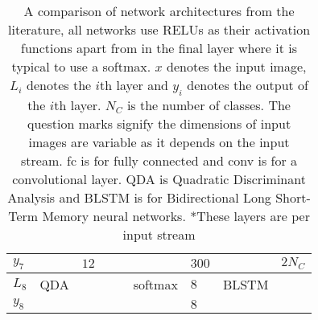 \begin{landscape}
\begin{table}[h!]
{\begin{tabular}{|lllllllll|}
\multicolumn{1}{|l|}{$y_7$}   &          & \multicolumn{1}{l|}{$12$}                          &          & \multicolumn{1}{l|}{}                                &               & \multicolumn{1}{l|}{$300$}                       &           & $2N_{C}$                       \\ \hline
\multicolumn{1}{|l|}{$L_8$}   & QDA      & \multicolumn{1}{l|}{}                              &          & \multicolumn{1}{l|}{}                                & softmax       & \multicolumn{1}{l|}{$8$}                         & BLSTM     &                                \\
\multicolumn{1}{|l|}{$y_8$}   &          & \multicolumn{1}{l|}{}                              &          & \multicolumn{1}{l|}{}                                &               & \multicolumn{1}{l|}{$8$}                         &           &                                \\ \hline
\end{tabular}

\caption{A comparison of network architectures from the literature, all networks
use RELUs as their activation functions apart from in the final layer where it is
typical to use a softmax. $x$ denotes the input image, $L_i$ denotes the $i$th layer and $y_i$ denotes the output of the $i$th layer.
$N_{C}$ is the number of classes.
The question marks signify the dimensions of input images are variable as it depends on the input stream. fc is for fully connected and
conv is for a convolutional layer. QDA is Quadratic Discriminant Analysis and BLSTM is for Bidirectional Long Short-Term Memory neural
networks.
\newline
*These layers are per input stream} \label{tab:compnet}

}
\end{table}
\end{landscape}
